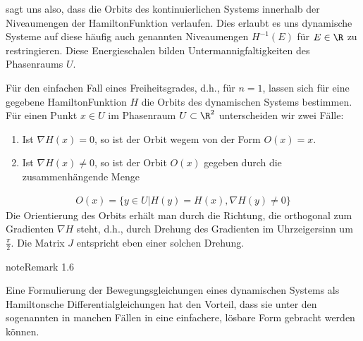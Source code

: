\documentclass[letterpaper,10pt,english]{jupyterBook}
\begin{document}
\sphinxAtStartPar
{\hyperref[\detokenize{ode/hamilton:satz:hamilton_konstant}]{}} sagt uns also, dass die Orbits des kontinuierlichen Systems innerhalb der Niveaumengen der Hamilton\sphinxhyphen{}Funktion verlaufen.
Dies erlaubt es uns dynamische Systeme auf diese häufig auch  genannten Niveaumengen \(H^{-1}(E)\) für \(E \in \R\) zu restringieren.
Diese Energieschalen bilden Untermannigfaltigkeiten des Phasenraums \(U\).

\sphinxAtStartPar
Für den einfachen Fall eines Freiheitsgrades, d.h., für \(n = 1\), lassen sich für eine gegebene Hamilton\sphinxhyphen{}Funktion \(H\) die Orbits des dynamischen Systems bestimmen.
Für einen Punkt \(x \in U\) im Phasenraum \(U \subset \R^2\) unterscheiden wir zwei Fälle:
\begin{enumerate}
%
\item {} 
\sphinxAtStartPar
Ist \(\nabla H(x) = 0\), so ist der Orbit wegem {\hyperref[\detokenize{ode/hamilton:equation-eq-hamilton-dgl}]{}} von der Form \(O(x) = {x}\).

\item {} 
\sphinxAtStartPar
Ist \(\nabla H(x) \neq 0\), so ist der Orbit \(O(x)\) gegeben durch die zusammenhängende Menge

\end{enumerate}
\begin{equation*}
\begin{split}O(x) = \{y \in U | H(y) = H(x), \nabla H(y) \neq 0\}\end{split}
\end{equation*}
\sphinxAtStartPar
Die Orientierung des Orbits erhält man durch die Richtung, die orthogonal zum Gradienten \(\nabla H\) steht, d.h., durch Drehung des Gradienten im Uhrzeigersinn um \(\frac{\pi}{2}\).
Die Matrix \(J\) entspricht eben einer solchen Drehung.
\label{ode/hamilton:remark-6}
\begin{sphinxadmonition}{note}{Remark 1.6}



\sphinxAtStartPar
Eine Formulierung der Bewegungsgleichungen eines dynamischen Systems als Hamiltonsche Differentialgleichungen hat den Vorteil, dass sie unter den sogenannten  in manchen Fällen in eine einfachere, lösbare Form gebracht werden können.
\end{sphinxadmonition}
\end{document}
